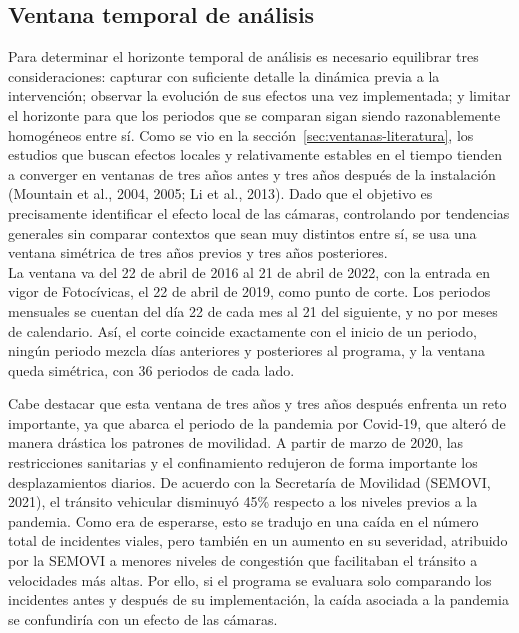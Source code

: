 \subsection{Ventana temporal de análisis}
\label{sec:ventana}
\noindent Para determinar el horizonte temporal de análisis es necesario equilibrar tres consideraciones: capturar con suficiente detalle la dinámica previa a la intervención; observar la evolución de sus efectos una vez implementada; y limitar el horizonte para que los periodos que se comparan sigan siendo razonablemente homogéneos entre sí. Como se vio en la sección~\ref{sec:ventanas-literatura}, los estudios que buscan efectos locales y relativamente estables en el tiempo tienden a converger en ventanas de tres años antes y tres años después de la instalación (Mountain et al., 2004, 2005; Li et al., 2013). Dado que el objetivo es precisamente identificar el efecto local de las cámaras, controlando por tendencias generales sin comparar contextos que sean muy distintos entre sí, se usa una ventana simétrica de tres años previos y tres años posteriores.\\

La ventana va del 22 de abril de 2016 al 21 de abril de 2022, con la entrada en vigor de Fotocívicas, el 22 de abril de 2019, como punto de corte. Los periodos mensuales se cuentan del día 22 de cada mes al 21 del siguiente, y no por meses de calendario. Así, el corte coincide exactamente con el inicio de un periodo, ningún periodo mezcla días anteriores y posteriores al programa, y la ventana queda simétrica, con 36 periodos de cada lado.

Cabe destacar que esta ventana de tres años y tres años después enfrenta un reto importante, ya que abarca el periodo de la pandemia por Covid-19, que alteró de manera drástica los patrones de movilidad. A partir de marzo de 2020, las restricciones sanitarias y el confinamiento redujeron de forma importante los desplazamientos diarios. De acuerdo con la Secretaría de Movilidad (SEMOVI, 2021), el tránsito vehicular disminuyó 45\% respecto a los niveles previos a la pandemia. Como era de esperarse, esto se tradujo en una caída en el número total de incidentes viales, pero también en un aumento en su severidad, atribuido por la SEMOVI a menores niveles de congestión que facilitaban el tránsito a velocidades más altas. Por ello, si el programa se evaluara solo comparando los incidentes antes y después de su implementación, la caída asociada a la pandemia se confundiría con un efecto de las cámaras.\\

